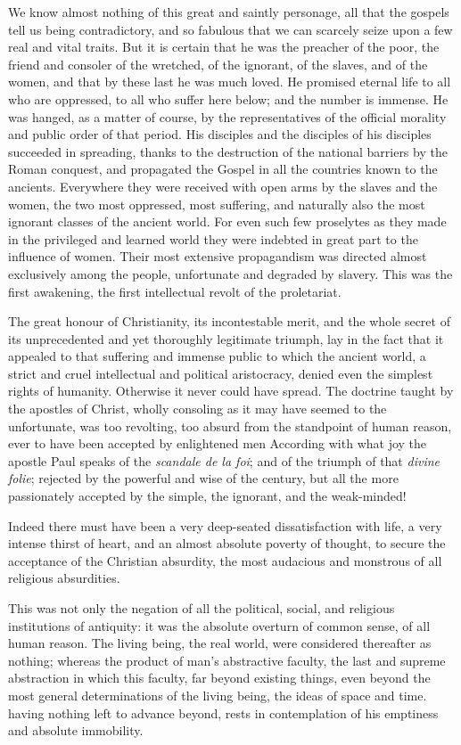 \documentclass[12pt]{report}
\begin{document}
We know almost nothing of this great and saintly personage, all that the gospels tell us being contradictory, and so fabulous that we can scarcely seize upon a few real and vital traits. But it is certain that he was the preacher of the poor, the friend and consoler of the wretched, of the ignorant, of the slaves, and of the women, and that by these last he was much loved. He promised eternal life to all who are oppressed, to all who suffer here below; and the number is immense. He was hanged, as a matter of course, by the representatives of the official morality and public order of that period. His disciples and the disciples of his disciples succeeded in spreading, thanks to the destruction of the national barriers by the Roman conquest, and propagated the Gospel in all the countries known to the ancients. Everywhere they were received with open arms by the slaves and the women, the two most oppressed, most suffering, and naturally also the most ignorant classes of the ancient world. For even such few proselytes as they made in the privileged and learned world they were indebted in great part to the influence of women. Their most extensive propagandism was directed almost exclusively among the people, unfortunate and degraded by slavery. This was the first awakening, the first intellectual revolt of the proletariat.


The great honour of Christianity, its incontestable merit, and the whole secret of its unprecedented and yet thoroughly legitimate triumph, lay in the fact that it appealed to that suffering and immense public to which the ancient world, a strict and cruel intellectual and political aristocracy, denied even the simplest rights of humanity. Otherwise it never could have spread. The doctrine taught by the apostles of Christ, wholly consoling as it may have seemed to the unfortunate, was too revolting, too absurd from the standpoint of human reason, ever to have been accepted by enlightened men According with what joy the apostle Paul speaks of the \emph{scandale de la foi}; and of the triumph of that \emph{divine folie}; rejected by the powerful and wise of the century, but all the more passionately accepted by the simple, the ignorant, and the weak-minded!


Indeed there must have been a very deep-seated dissatisfaction with life, a very intense thirst of heart, and an almost absolute poverty of thought, to secure the acceptance of the Christian absurdity, the most audacious and monstrous of all religious absurdities.


This was not only the negation of all the political, social, and religious institutions of antiquity: it was the absolute overturn of common sense, of all human reason. The living being, the real world, were considered thereafter as nothing; whereas the product of man’s abstractive faculty, the last and supreme abstraction in which this faculty, far beyond existing things, even beyond the most general determinations of the living being, the ideas of space and time. having nothing left to advance beyond, rests in contemplation of his emptiness and absolute immobility.
\end{document}
